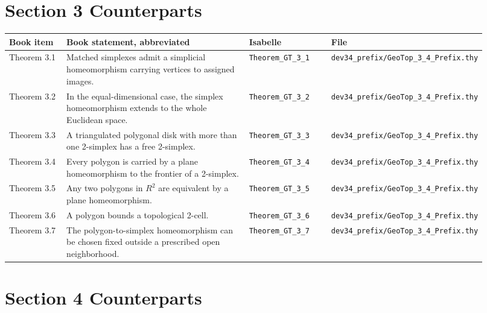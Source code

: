 \documentclass{article}
\begin{document}
\section*{Section 3 Counterparts}

\begin{longtable}{>{\raggedright\arraybackslash}p{0.13\linewidth}
                  >{\raggedright\arraybackslash}p{0.45\linewidth}
                  >{\raggedright\arraybackslash}p{0.18\linewidth}
                  >{\raggedright\arraybackslash}p{0.16\linewidth}}
\textbf{Book item} & \textbf{Book statement, abbreviated} & \textbf{Isabelle} & \textbf{File}\\
\hline
Theorem 3.1 & Matched simplexes admit a simplicial homeomorphism carrying vertices to assigned images. & \texttt{Theorem\_GT\_3\_1} & \texttt{dev34\_prefix/GeoTop\_3\_4\_Prefix.thy}\\
Theorem 3.2 & In the equal-dimensional case, the simplex homeomorphism extends to the whole Euclidean space. & \texttt{Theorem\_GT\_3\_2} & \texttt{dev34\_prefix/GeoTop\_3\_4\_Prefix.thy}\\
Theorem 3.3 & A triangulated polygonal disk with more than one 2-simplex has a free 2-simplex. & \texttt{Theorem\_GT\_3\_3} & \texttt{dev34\_prefix/GeoTop\_3\_4\_Prefix.thy}\\
Theorem 3.4 & Every polygon is carried by a plane homeomorphism to the frontier of a 2-simplex. & \texttt{Theorem\_GT\_3\_4} & \texttt{dev34\_prefix/GeoTop\_3\_4\_Prefix.thy}\\
Theorem 3.5 & Any two polygons in \(R^2\) are equivalent by a plane homeomorphism. & \texttt{Theorem\_GT\_3\_5} & \texttt{dev34\_prefix/GeoTop\_3\_4\_Prefix.thy}\\
Theorem 3.6 & A polygon bounds a topological 2-cell. & \texttt{Theorem\_GT\_3\_6} & \texttt{dev34\_prefix/GeoTop\_3\_4\_Prefix.thy}\\
Theorem 3.7 & The polygon-to-simplex homeomorphism can be chosen fixed outside a prescribed open neighborhood. & \texttt{Theorem\_GT\_3\_7} & \texttt{dev34\_prefix/GeoTop\_3\_4\_Prefix.thy}\\
\end{longtable}

\section*{Section 4 Counterparts}
\end{document}

